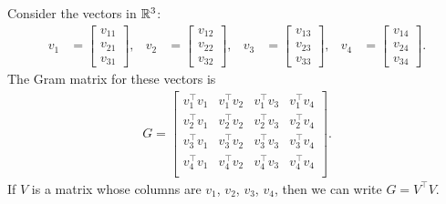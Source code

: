 \def\v{v}
% 
Consider the vectors in \(\mathbb{R}^3\):
\begin{align*}
    \v_1 &=
    \begin{bmatrix}
        v_{11} \\ v_{21} \\ v_{31}
    \end{bmatrix},&
    \v_2 &=
    \begin{bmatrix}
        v_{12} \\ v_{22} \\ v_{32}
    \end{bmatrix},&
    \v_3 &=
    \begin{bmatrix}
        v_{13} \\ v_{23} \\ v_{33}
    \end{bmatrix},&
    \v_4 &=
    \begin{bmatrix}
        v_{14} \\ v_{24} \\ v_{34}
    \end{bmatrix}.
\end{align*}
The Gram matrix for these vectors is
\begin{align*}
    G = \begin{bmatrix}
        \v_1^\top \v_1 & \v_1^\top \v_2 & \v_1^\top \v_3 & \v_1^\top \v_4\\[3pt]
        \v_2^\top \v_1 & \v_2^\top \v_2 & \v_2^\top \v_3 & \v_2^\top \v_4\\[3pt]
        \v_3^\top \v_1 & \v_3^\top \v_2 & \v_3^\top \v_3 & \v_3^\top \v_4\\[3pt]
        \v_4^\top \v_1 & \v_4^\top \v_2 & \v_4^\top \v_3 & \v_4^\top \v_4\\
    \end{bmatrix}.
\end{align*}
If \(V\) is a matrix whose columns are \(\v_1\), \(\v_2\), \(\v_3\), \(\v_4\), then we can write \(G = V^\top V\).
